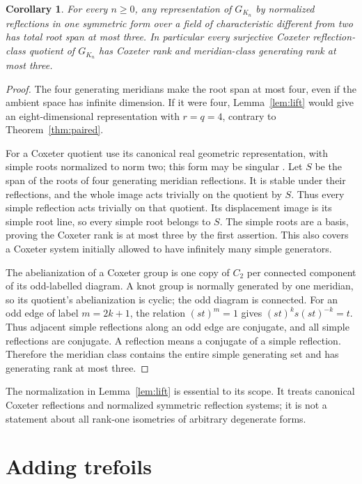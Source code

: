 \documentclass[11pt]{article}
\newtheorem{corollary}[theorem]{Corollary}
\begin{document}
\begin{corollary}\label{cor:coxeter}
For every $n\ge0$, any representation of $G_{K_n}$ by normalized
reflections in one symmetric form over a field of characteristic
different from two has total root span at most three. In particular
every surjective Coxeter reflection-class quotient of $G_{K_n}$ has
Coxeter rank and meridian-class generating rank at most three.
\end{corollary}
\begin{proof}
The four generating meridians make the root span at most four, even
if the ambient space has infinite dimension. If it were four,
Lemma~\ref{lem:lift} would give an eight-dimensional representation
with $r=q=4$, contrary to Theorem~\ref{thm:paired}.

For a Coxeter quotient use its canonical real geometric
representation, with simple roots normalized to norm two; this form
may be singular \cite{davis}. Let $S$ be the span of the roots of four
generating meridian reflections. It is stable under their reflections,
and the whole image acts trivially on the quotient by $S$. Thus every
simple reflection acts trivially on that quotient. Its displacement
image is its simple root line, so every simple root belongs to $S$.
The simple roots are a basis, proving the Coxeter rank is at most
three by the first assertion. This also covers a Coxeter system
initially allowed to have infinitely many simple generators.

The abelianization of a Coxeter group is one copy of $C_2$ per
connected component of its odd-labelled diagram. A knot group is
normally generated by one meridian, so its quotient's abelianization
is cyclic; the odd diagram is connected. For an odd edge of label $m=2k+1$, the relation $(st)^m=1$ gives
$(st)^k s(st)^{-k}=t$. Thus adjacent simple reflections along an
odd edge are conjugate, and all simple reflections are conjugate.
A reflection means a conjugate of a simple reflection. Therefore the
meridian class contains the entire simple generating set and has
generating rank at most three.
\end{proof}

The normalization in Lemma~\ref{lem:lift} is essential to its scope.
It treats canonical Coxeter reflections and normalized symmetric
reflection systems; it is not a statement about all rank-one
isometries of arbitrary degenerate forms.

\section{Adding trefoils}
\end{document}

